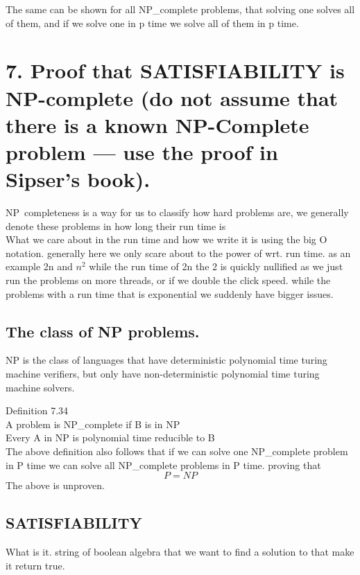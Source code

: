 \documentclass[a4paper,10pt,titlepage]{report}
\begin{document}
The same can be shown for all NP\_complete problems, that solving one solves all of them, and if we solve one in p time we solve all of them in p time.


\newpage
\section{7. Proof that SATISFIABILITY is NP-complete (do not assume that
there is a known NP-Complete problem — use the proof in Sipser’s
book).}
NP\ completeness is a way for us to classify how hard problems are, we generally denote these problems in how long their run time is\\

What we care about in the run time and how we write it is using the big O notation. generally here we only scare about to the power of wrt. run time. as an example 2n and $n^2$ while the run time of 2n the 2 is quickly nullified as we just run the problems on more threads, or if we double the click speed. while the problems with a run time that is exponential we suddenly have bigger issues. 

\subsection{The class of NP problems.}
NP is the class of languages that have deterministic polynomial time turing machine verifiers, but only have non-deterministic polynomial time turing machine solvers.

Definition 7.34\\
A problem is NP\_complete if B is in NP\\
Every A in NP is polynomial time reducible to B\\

The above definition also follows that if we can solve one NP\_complete problem in P time we can solve all NP\_complete problems in P time. proving that\\
\begin{equation}
P = NP
\end{equation}
The above is unproven. \\

\subsection{SATISFIABILITY}

What is it. string of boolean algebra that we want to find a solution to that make it return true.
\end{document}
